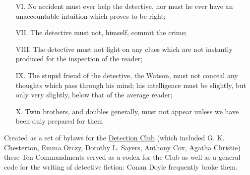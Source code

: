 \documentclass[a4paper,landscape,headrule,footrule,xetex]{foils}
\begin{document}
\begin{itemize}
\item[VI.]   No accident must ever help the detective, nor must he ever have an unaccountable intuition which proves to be right;
\item[VII.]  The detective must not, himself, commit the crime;
\item[VIII.] The detective must not light on any clues which are not
  instantly produced for the inspection of the reader;
\item[IX.] The stupid friend of the detective, the Watson, must not
  conceal any thoughts which pass through his mind; his intelligence
  must be slightly, but only very slightly, below that of the average
  reader;
\item[X.] Twin brothers, and doubles generally, must not appear unless
  we have been duly prepared for them
\end{itemize}

Created as a set of bylaws for the
\href{https://en.wikipedia.org/wiki/Detection_Club}{Detection Club}
(which included G. K.  Chesterton, Emma Orczy, Dorothy L. Sayers,
Anthony Cox, Agatha Christie) these Ten Commandments served as a codex
for the Club as well as a general code for the writing of detective
fiction: Conan Doyle frequently broke them.


\small


\end{document}
